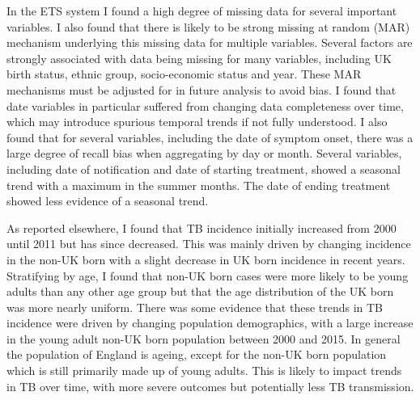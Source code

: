 \documentclass[11pt,twoside]{bristolthesis}
\begin{document}
  In the ETS system I found a high degree of missing data for several important variables. I also found that there is likely to be strong missing at random (MAR) mechanism underlying this missing data for multiple variables. Several factors are strongly associated with data being missing for many variables, including UK birth status, ethnic group, socio-economic status and year. These MAR mechanisms must be adjusted for in future analysis to avoid bias. I found that date variables in particular suffered from changing data completeness over time, which may introduce spurious temporal trends if not fully understood. I also found that for several variables, including the date of symptom onset, there was a large degree of recall bias when aggregating by day or month. Several variables, including date of notification and date of starting treatment, showed a seasonal trend with a maximum in the summer months. The date of ending treatment showed less evidence of a seasonal trend.
  
  As reported elsewhere, I found that TB incidence initially increased from 2000 until 2011 but has since decreased. This was mainly driven by changing incidence in the non-UK born with a slight decrease in UK born incidence in recent years. Stratifying by age, I found that non-UK born cases were more likely to be young adults than any other age group but that the age distribution of the UK born was more nearly uniform. There was some evidence that these trends in TB incidence were driven by changing population demographics, with a large increase in the young adult non-UK born population between 2000 and 2015. In general the population of England is ageing, except for the non-UK born population which is still primarily made up of young adults. This is likely to impact trends in TB over time, with more severe outcomes but potentially less TB transmission.
  
\end{document}
